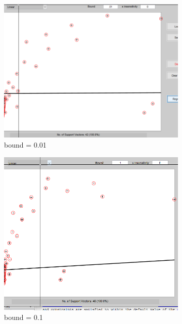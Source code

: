 \documentclass[11pt,oneside,a4paper]{article}
\begin{document}
\begin{figure}[H]
	\begin{subfigure}[b]{0.4\textwidth}
		\includegraphics[width=\textwidth]{../Figures/linear_b_01}
		\caption{bound = 0.01}
	\end{subfigure}
	\begin{subfigure}[b]{0.4\textwidth}
		\includegraphics[width=\textwidth]{../Figures/linear_b_1}
		\caption{bound = 0.1}
	\end{subfigure}
	\begin{subfigure}[b]{0.4\textwidth}

\end{subfigure}
\end{figure}
\end{document}
